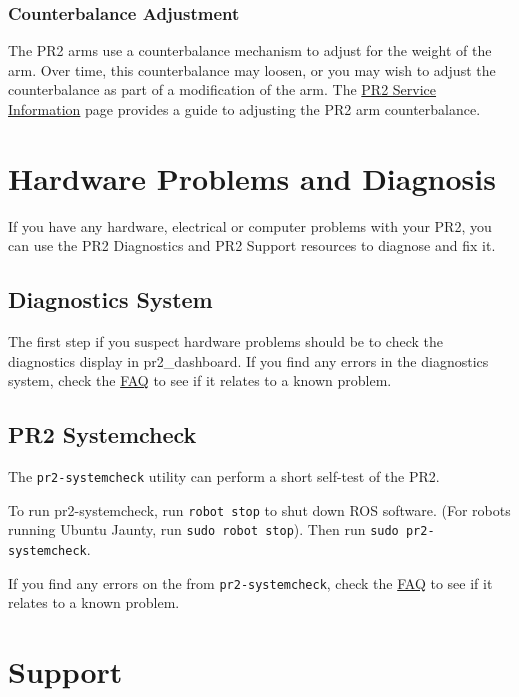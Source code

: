 \subsubsection{Counterbalance Adjustment}

The PR2 arms use a counterbalance mechanism to adjust for the weight of the arm. Over time, this counterbalance may loosen, or you may wish to adjust the counterbalance as part of a modification of the arm. The \href{http://pr2support.willowgarage.com/wiki/PR2 Service Information}{PR2 Service Information} page provides a guide to adjusting the PR2 arm counterbalance.

\section{Hardware Problems and Diagnosis}

If you have any hardware, electrical or computer problems with your PR2, you can use the PR2 Diagnostics and PR2 Support resources to diagnose and fix it.

\subsection{Diagnostics System}

The first step if you suspect hardware problems should be to check the diagnostics display in pr2\_dashboard. If you find any errors in the diagnostics system, check the \href{http://pr2support.willowgarage.com/wiki/FAQ}{FAQ} to see if it relates to a known problem.

\subsection{PR2 Systemcheck}

The \texttt{pr2-systemcheck} utility can perform a short self-test of the PR2. 

To run pr2-systemcheck, run \texttt{robot stop} to shut down ROS software. (For robots running Ubuntu Jaunty, run \texttt{sudo robot stop}). Then run \texttt{sudo pr2-systemcheck}. 

If you find any errors on the from \texttt{pr2-systemcheck}, check the \href{http://pr2support.willowgarage.com/wiki/FAQ}{FAQ} to see if it relates to a known problem.

\section{Support}

